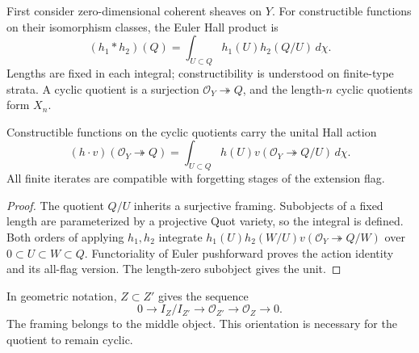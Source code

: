 First consider zero-dimensional coherent sheaves on $Y$.
For constructible functions on their isomorphism classes,
the Euler Hall product is
\[
 (h_1*h_2)(Q)=\int_{U\subset Q}h_1(U)h_2(Q/U)\,d\chi.
\]
Lengths are fixed in each integral; constructibility is
understood on finite-type strata. A cyclic quotient is a
surjection $\mathcal O_Y\twoheadrightarrow Q$, and the
length-$n$ cyclic quotients form $X_n$.

\begin{proposition}\label{cyprim:prop:cyclic-action}
Constructible functions on the cyclic quotients carry the
unital Hall action
\[
 (h\cdot v)(\mathcal O_Y\twoheadrightarrow Q)
 =\int_{U\subset Q}h(U)
       v(\mathcal O_Y\twoheadrightarrow Q/U)\,d\chi.
\]
All finite iterates are compatible with forgetting stages
of the extension flag.
\end{proposition}

\begin{proof}
The quotient $Q/U$ inherits a surjective framing. Subobjects
of a fixed length are parameterized by a projective Quot
variety, so the integral is defined. Both orders of applying
$h_1,h_2$ integrate
$h_1(U)h_2(W/U)v(\mathcal O_Y\twoheadrightarrow Q/W)$ over
$0\subset U\subset W\subset Q$. Functoriality of Euler
pushforward proves the action identity and its all-flag
version. The length-zero subobject gives the unit.
\end{proof}

In geometric notation, $Z\subset Z'$ gives the sequence
\[
 0\longrightarrow I_Z/I_{Z'}\longrightarrow\mathcal O_{Z'}
   \longrightarrow\mathcal O_Z\longrightarrow0.
\]
The framing belongs to the middle object. This orientation
is necessary for the quotient to remain cyclic.

